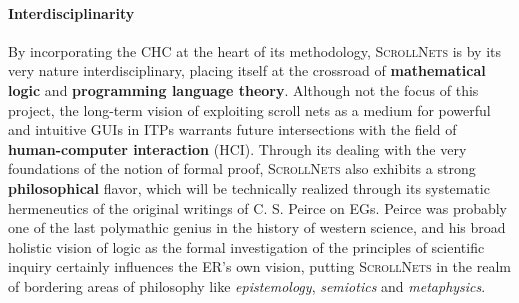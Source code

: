 \documentclass[11pt]{msca-pf}
\newcommand{\proj}{\small\textsc{ScrollNets}}
\newcommand{\WP}[1]{$\mathsf{WP#1}$}
\begin{document}

\paragraph{Interdisciplinarity} By incorporating the CHC at the heart of its methodology, {\proj} is
by its very nature interdisciplinary, placing itself at the crossroad of \textbf{mathematical logic}
and \textbf{programming language theory}. Although not the focus of this project, the long-term
vision of exploiting scroll nets as a medium for powerful and intuitive GUIs in ITPs warrants future
intersections with the field of \textbf{human-computer interaction} (HCI). Through its dealing with
the very foundations of the notion of formal proof, {\proj} also exhibits a strong
\textbf{philosophical} flavor, which will be technically realized through its systematic
hermeneutics of the original writings of C. S. Peirce on EGs. Peirce was probably one of the last
polymathic genius in the history of western science, and his broad holistic vision of logic as the
formal investigation of the principles of scientific inquiry certainly influences the ER's own
vision, putting {\proj} in the realm of bordering areas of philosophy like \emph{epistemology},
\emph{semiotics} and \emph{metaphysics}.
\end{document}

